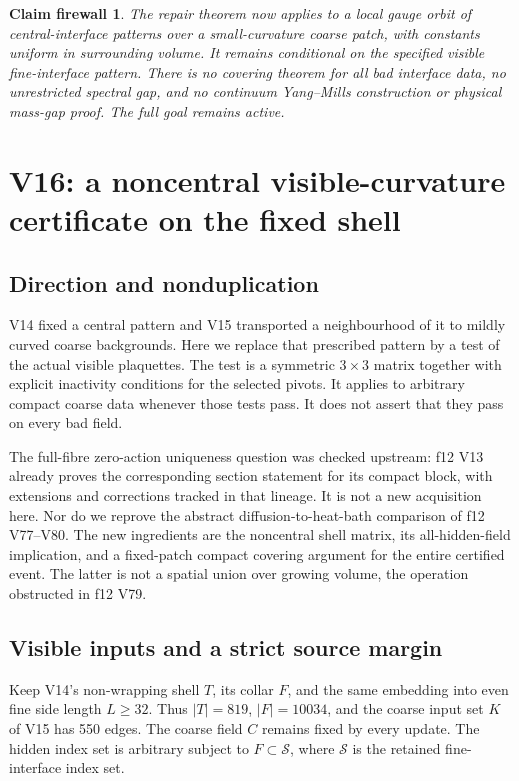 \documentclass[11pt,oneside]{article}
\newtheorem{firewall}[theorem]{Claim firewall}
\begin{document}
\begin{firewall}
The repair theorem now applies
to a local gauge orbit of
central-interface patterns
over a small-curvature coarse
patch, with constants uniform
in surrounding volume.
It remains conditional on
the specified visible
fine-interface pattern.
There is no covering theorem
for all bad interface data,
no unrestricted spectral
gap, and no continuum
Yang--Mills construction or
physical mass-gap proof.
The full goal remains active.
\end{firewall}
\section{V16: a noncentral visible-curvature certificate on the fixed shell}
\label{sec:f13v16}

\subsection{Direction and nonduplication}

V14 fixed a central pattern and V15 transported a
neighbourhood of it to mildly curved coarse backgrounds.
Here we replace that prescribed pattern by a test of
the actual visible plaquettes. The test is a symmetric
\(3\times3\) matrix together with explicit inactivity
conditions for the selected pivots. It applies to
arbitrary compact coarse data whenever those tests pass.
It does not assert that they pass on every bad field.

The full-fibre zero-action uniqueness question was
checked upstream: f12 V13 already proves the corresponding
section statement for its compact block, with extensions
and corrections tracked in that lineage. It is not a
new acquisition here. Nor do we reprove the abstract
diffusion-to-heat-bath comparison of f12 V77--V80.
The new ingredients are the noncentral shell matrix,
its all-hidden-field implication, and a fixed-patch
compact covering argument for the entire certified event.
The latter is not a spatial union over growing volume,
the operation obstructed in f12 V79.

\subsection{Visible inputs and a strict source margin}

Keep V14's non-wrapping shell \(T\), its collar \(F\),
and the same embedding into even fine side length
\(L\ge32\). Thus \(|T|=819\), \(|F|=10034\), and
the coarse input set \(K\) of V15 has 550 edges.
The coarse field \(C\) remains fixed by every update.
The hidden index set is arbitrary subject to
\(F\subset\mathcal S\), where \(\mathcal S\) is the
retained fine-interface index set.
\end{document}
